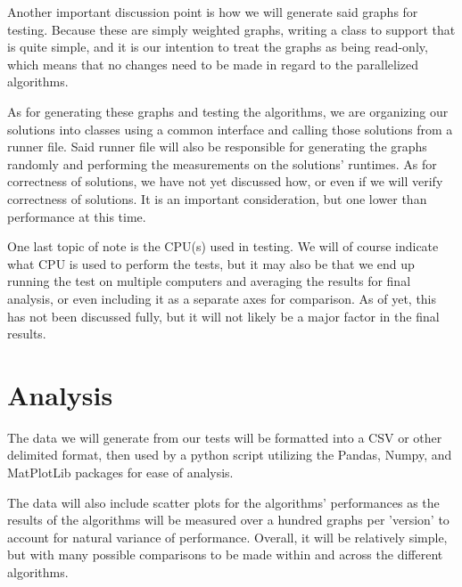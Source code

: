 \documentclass{article}
\begin{document}
Another important discussion point is how we will generate said graphs for testing. Because these are simply weighted graphs, writing a class to support that is quite simple, and it is our intention to treat the graphs as being read-only, which means that no changes need to be made in regard to the parallelized algorithms.

As for generating these graphs and testing the algorithms, we are organizing our solutions into classes using a common interface and calling those solutions from a runner file. Said runner file will also be responsible for generating the graphs randomly and performing the measurements on the solutions' runtimes. As for correctness of solutions, we have not yet discussed how, or even if we will verify correctness of solutions. It is an important consideration, but one lower than performance at this time.

One last topic of note is the CPU(s) used in testing. We will of course indicate what CPU is used to perform the tests, but it may also be that we end up running the test on multiple computers and averaging the results for final analysis, or even including it as a separate axes for comparison. As of yet, this has not been discussed fully, but it will not likely be a major factor in the final results.
\section{Analysis}
The data we will generate from our tests will be formatted into a CSV or other delimited format, then used by a python script utilizing the Pandas, Numpy, and MatPlotLib packages for ease of analysis.

The data will also include scatter plots for the algorithms' performances as the results of the algorithms will be measured over a hundred graphs per 'version' to account for natural variance of performance. Overall, it will be relatively simple, but with many possible comparisons to be made within and across the different algorithms.
\end{document}
